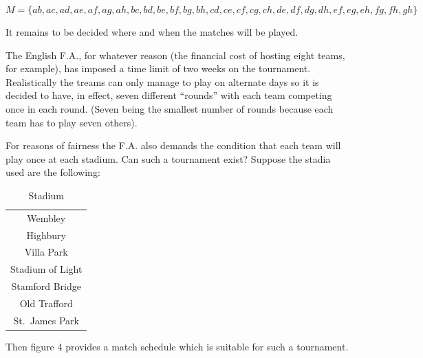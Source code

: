 \documentclass[
  12pt,
  a4paper]{book}
\begin{document}
\[ 
M = \{
  ab,ac,ad,ae,af,ag,ah,bc,bd,be,bf,bg,bh,cd,
  ce,cf,cg,ch,de,df,dg,dh,ef,eg,eh,fg,fh,gh
\}
\]

It remains to be decided where and when the matches will be played.

The English F.A., for whatever reason (the financial cost of hosting
eight teams, for example), has imposed a time limit of two weeks on the
tournament. Realistically the treams can only manage to play on
alternate days so it is decided to have, in effect, seven different
``rounds'' with each team competing once in each round. (Seven being
the smallest number of rounds because each team has to play seven
others).

For reasons of fairness the F.A. also demands the condition that each
team will play once at each stadium.
Can such a tournament exist?
Suppose the stadia used are the following:

\begin{longtable}[]{@{}c@{}}
\caption{Stadium}\tabularnewline
\toprule
\endhead
\begin{minipage}[t]{0.26\columnwidth}\centering
Wembley\strut
\end{minipage}\tabularnewline
\begin{minipage}[t]{0.26\columnwidth}\centering
Highbury\strut
\end{minipage}\tabularnewline
\begin{minipage}[t]{0.26\columnwidth}\centering
Villa Park\strut
\end{minipage}\tabularnewline
\begin{minipage}[t]{0.26\columnwidth}\centering
Stadium of Light\strut
\end{minipage}\tabularnewline
\begin{minipage}[t]{0.26\columnwidth}\centering
Stamford Bridge\strut
\end{minipage}\tabularnewline
\begin{minipage}[t]{0.26\columnwidth}\centering
Old Trafford\strut
\end{minipage}\tabularnewline
\begin{minipage}[t]{0.26\columnwidth}\centering
St.~James Park\strut
\end{minipage}\tabularnewline
\bottomrule
\end{longtable}

Then figure 4 provides a match schedule which is suitable for such a
tournament.
\end{document}
